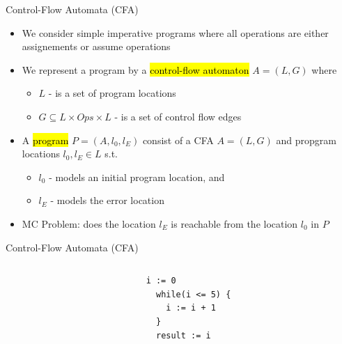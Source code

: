 \begin{frame}{Control-Flow Automata (CFA)}
\begin{itemize}
  \itemsep1em 
  \item We consider simple imperative programs where all operations are either
  assignements or assume operations
  \item We represent a program by a \hl{control-flow automaton} $A =
  (L, G)$ where
    \begin{itemize}
      \itemsep 0.1cm 
      \item $L$ - is a set of program locations
      \item $G \subseteq L \times Ops \times L$ - is a set of control flow edges
  \end{itemize}
  \item A \hl{program} $P = (A, l_0, l_E)$ consist of a CFA $A = (L, G)$ and
  propgram locations $l_0, l_E \in L$ s.t.
    \begin{itemize}
      \itemsep 0.1cm
      \item $l_0$ - models an initial program location, and
      \item $l_E$ - models the error location
  \end{itemize}
  \item MC Problem: does the location $l_E$ is reachable from the location $l_0$
  in $P$
\end{itemize}
\end{frame}


\begin{frame}[fragile]{Control-Flow Automata (CFA)}
\begin{columns}
  \begin{column}{0.6\textwidth}    
    \begin{overprint}
        
    \end{overprint}
  \end{column}
  \begin{column}{0.4\textwidth}
    \begin{overprint}
      \begin{example}   
        \begin{lstlisting}[escapechar=\%]
  i := 0
  while(i <= 5) {
    i := i + 1
  }
  result := i
        \end{lstlisting}
      \end{example}
    \end{overprint} 
  \end{column}
\end{columns}
\end{frame}

